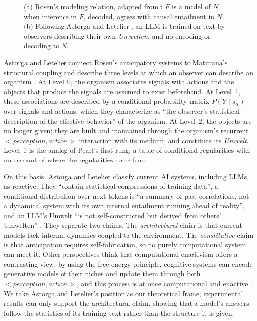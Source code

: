 \documentclass{llncs}
\begin{document}
\begin{figure}[t]
  \centering
  
  \caption{(a) Rosen's modeling relation, adapted from \cite[Fig.~2.1]{rosen2012anticipatory}:
  $F$ is a model of $N$ when inference in $F$, decoded, agrees with causal
  entailment in $N$. (b) Following Astorga and Letelier
  \cite{astorga2026anticipation}, an LLM is trained on text by observers describing their own \emph{Umwelten}, and no encoding or decoding to $N$.}
  \label{fig:rosen}
\end{figure}


Astorga and Letelier connect Rosen's anticipatory systems to Maturana's structural coupling and describe three levels at which an observer can describe an organism \cite{astorga2026anticipation}. At Level~0, the organism associates signals with actions and the objects that produce the signals are assumed to exist beforehand. At Level~1, these associations are described by a conditional probability matrix $P(Y \mid s_\alpha)$ over signals and actions, which they characterize as ``the observer's statistical description of the effective behavior'' of the organism. At Level~2, the objects are no longer given; they are built and maintained through the organism's recurrent $<perception, action>$ interaction with its medium, and constitute its \emph{Umwelt}. Level~1 is the analog of Pearl's first rung: a table of conditional regularities with no account of where the regularities come from.

On this basis, Astorga and Letelier classify current AI systems, including LLMs, as reactive. They ``contain statistical compressions of training data'', a conditional distribution over next tokens is ``a summary of past correlations, not a dynamical system with its own internal entailment running ahead of reality'', and an LLM's Umwelt ``is not self-constructed but derived from others' Umwelten'' \cite{astorga2026anticipation}. They separate two claims. The \textit{architectural} claim is that current models lack internal dynamics coupled to the environment. The \textit{constitutive} claim is that anticipation requires self-fabrication, so no purely computational system can meet it. Other perspectives think that computational enactivism offers a contrasting view: by using the free energy principle, cognitive systems can encode generative models of their niches and update them through both $<perception,action>$, and this process is at once computational and enactive \cite{korbak2021computational}.  We take Astorga and Letelier's position as our theoretical frame; experimental results can only support the architectural claim, showing that a model's answers follow the statistics of its training text rather than the structure it is given. 
\end{document}
